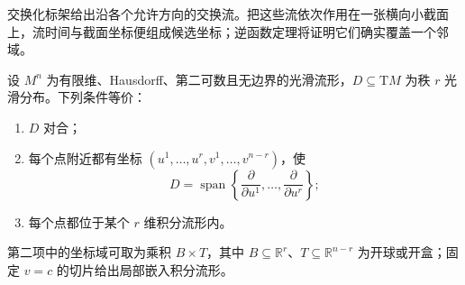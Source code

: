 交换化标架给出沿各个允许方向的交换流。把这些流依次作用在一张横向小截面上，流时间与截面坐标便组成候选坐标；逆函数定理将证明它们确实覆盖一个邻域。

\begin{theorem}[Frobenius 定理]\label{g1:thm:frobenius}
	设 \(M^n\) 为有限维、Hausdorff、第二可数且无边界的光滑流形，\(D\subseteq \mathrm{T}M\) 为秩 \(r\) 光滑分布。下列条件等价：
	\begin{enumerate}
		\item \(D\) 对合；
		\item 每个点附近都有坐标 \((u^1,\ldots,u^r,v^1,\ldots,v^{n-r})\)，使
		\[
			D=\operatorname{span}\left\{\frac{\partial}{\partial u^1},\ldots,\frac{\partial}{\partial u^r}\right\};
		\]
		\item 每个点都位于某个 \(r\) 维积分流形内。
	\end{enumerate}
	第二项中的坐标域可取为乘积 \(B\times T\)，其中 \(B\subseteq\mathbb R^r\)、\(T\subseteq\mathbb R^{n-r}\) 为开球或开盒；固定 \(v=c\) 的切片给出局部嵌入积分流形。
\end{theorem}
